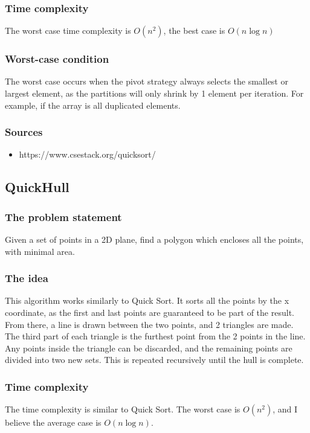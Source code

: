 \documentclass{article}
\begin{document}
        \subsubsection{Time complexity}
            The worst case time complexity is \(O(n^2)\), the best case is \(O(n \log n)\)
        \subsubsection{Worst-case condition}
            The worst case occurs when the pivot strategy always selects the smallest or largest element, as the partitions will only shrink by 1 element per iteration.
            For example, if the array is all duplicated elements.
        \subsubsection{Sources}
            \begin{itemize}
                \item https://www.csestack.org/quicksort/
            \end{itemize}
    \subsection{QuickHull}
        \subsubsection{The problem statement}
            Given a set of points in a 2D plane, find a polygon which encloses all the points, with minimal area.
        \subsubsection{The idea}
            This algorithm works similarly to Quick Sort.
            It sorts all the points by the x coordinate, as the first and last points are guaranteed to be part of the result.
            From there, a line is drawn between the two points, and 2 triangles are made. 
            The third part of each triangle is the furthest point from the 2 points in the line.
            Any points inside the triangle can be discarded, and the remaining points are divided into two new sets.
            This is repeated recursively until the hull is complete.
        \subsubsection{Time complexity}
            The time complexity is similar to Quick Sort. The worst case is \(O(n^2)\), and I believe the average case is \(O(n \log n)\).
\end{document}
